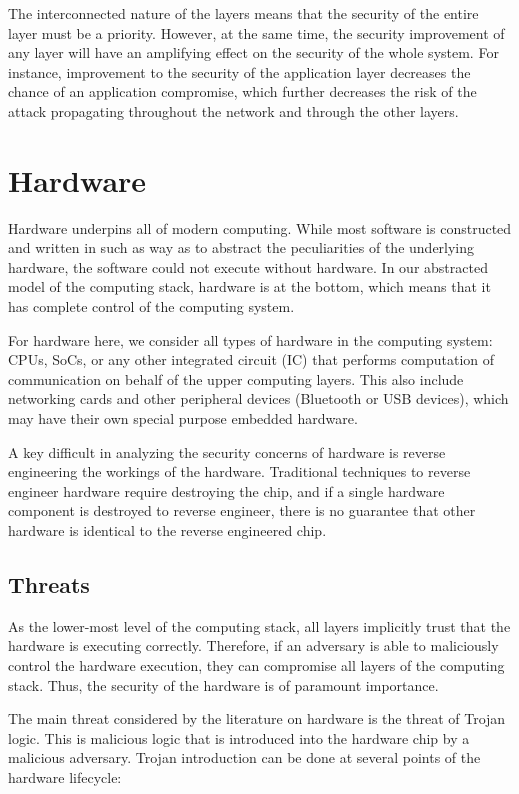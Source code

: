 \documentclass[11pt,letterpaper]{article}
\begin{document}
The interconnected nature of the layers means that the security of the
entire layer must be a priority. However, at the same time, the
security improvement of any layer will have an amplifying effect on
the security of the whole system. For instance, improvement to the
security of the application layer decreases the chance of an
application compromise, which further decreases the risk of the attack
propagating throughout the network and through the other layers.

\section{Hardware}

Hardware underpins all of modern computing. While most software is
constructed and written in such as way as to abstract the
peculiarities of the underlying hardware, the software could not
execute without hardware. In our abstracted model of the computing
stack, hardware is at the bottom, which means that it has complete
control of the computing system.

For hardware here, we consider all types of hardware in the computing
system: CPUs, SoCs, or any other integrated circuit (IC) that performs
computation of communication on behalf of the upper computing layers.
This also include networking cards and other peripheral devices
(Bluetooth or USB devices), which may have their own special purpose
embedded hardware.

A key difficult in analyzing the security concerns of hardware is
reverse engineering the workings of the hardware. Traditional
techniques to reverse engineer hardware require destroying the chip,
and if a single hardware component is destroyed to reverse engineer,
there is no guarantee that other hardware is identical to the reverse
engineered chip.

\subsection{Threats}

As the lower-most level of the computing stack, all layers implicitly
trust that the hardware is executing correctly. Therefore, if an
adversary is able to maliciously control the hardware execution, they
can compromise all layers of the computing stack. Thus, the security
of the hardware is of paramount importance.

The main threat considered by the literature on hardware is the threat
of Trojan logic. This is malicious logic that is introduced into the
hardware chip by a malicious adversary. Trojan introduction can be
done at several points of the hardware lifecycle:
\end{document}
